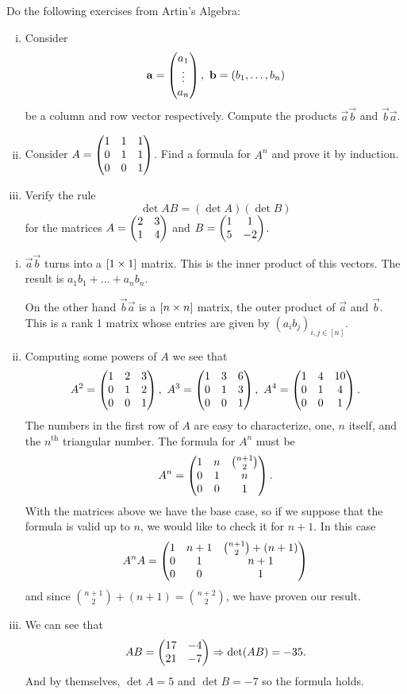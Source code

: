 \documentclass[12pt]{memoir}
\begin{document}

\begin{Ej}Do the following exercises from Artin's Algebra:
  \begin{enumerate}[i)]
    \item Consider
    $$\mathbf{a}=\begin{pmatrix} a_1 \\ \vdots \\ a_n \end{pmatrix},\ \mathbf{b}=(b_1,\dots,b_n)$$
    be a column and row vector respectively. Compute the products $\vec{a}\vec{b}$ and $\vec{b}\vec{a}$.
    \item Consider $A=\begin{pmatrix} 1 & 1 & 1 \\ 0 & 1 & 1 \\ 0 & 0 & 1 \end{pmatrix}$. Find a formula for $A^n$ and prove it by induction.
    \item Verify the rule 
    $$\det AB = (\det A)(\det B)$$ 
    for the matrices $A=\begin{pmatrix} 2 & 3 \\ 1 & 4 \end{pmatrix}$ and $B=\begin{pmatrix} 1 & 1 \\ 5 & -2 \end{pmatrix}$.
  \end{enumerate}
\end{Ej}

\begin{ptcbr}
\begin{enumerate}[i)]
    \item $\vec a\vec b$ turns into a $[1\times 1]$ matrix. This is the inner product of this vectors. The result is $a_1b_1+\dots+a_nb_n$.\par 
    On the other hand $\vec b\vec a$ is a $[n\times n]$ matrix, the outer product of $\vec a$ and $\vec b$. This is a rank 1 matrix whose entries are given by $(a_ib_j)_{i,j\in[n]}$.
    \item Computing some powers of $A$ we see that
    $$A^2=\threebythree{1}{2}{3}{0}{1}{2}{0}{0}{1},\ A^3=\threebythree{1}{3}{6}{0}{1}{3}{0}{0}{1},\ A^4=\threebythree{1}{4}{10}{0}{1}{4}{0}{0}{1}.$$
    The numbers in the first row of $A$ are easy to characterize, one, $n$ itself, and the $n^{\text{th}}$ triangular number. The formula for $A^n$ must be 
    $$A^n=\begin{pmatrix} 1 & n & \binom{n+1}{2} \\ 0 & 1 & n \\ 0 & 0 & 1 \end{pmatrix}.$$
    With the matrices above we have the base case, so if we suppose that the formula is valid up to $n$, we would like to check it for $n+1$. In this case 
    $$A^nA=\begin{pmatrix} 1 & n+1 & \binom{n+1}{2}+(n+1) \\ 0 & 1 & n+1 \\ 0 & 0 & 1 \end{pmatrix}$$
    and since $\binom{n+1}{2}+(n+1)=\binom{n+2}{2}$, we have proven our result.
    \item We can see that
    $$AB=\begin{pmatrix} 17 & -4 \\ 21 & -7 \end{pmatrix}\Rightarrow \det(AB)=-35.$$
    And by themselves, $\det A=5$ and $\det B= -7$ so the formula holds. 
\end{enumerate}
\end{ptcbr}

\end{document}
